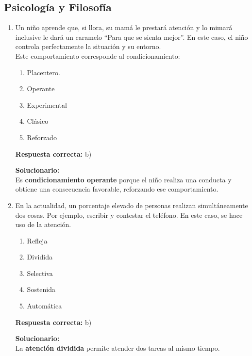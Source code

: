 \subsection*{Psicología y Filosofía}

\begin{enumerate}
	
	
	\item Un niño aprende que, si llora, su mamá le prestará atención y lo mimará inclusive le dará un caramelo “Para que se sienta mejor”. En este caso, el niño controla perfectamente la situación y su entorno.\\
	Este comportamiento corresponde al condicionamiento:
	\begin{enumerate}[label=\alph*)]
		\item Placentero.
		\item Operante
		\item Experimental
		\item Clásico
		\item Reforzado
	\end{enumerate}
	\textbf{Respuesta correcta:} b)
	
	\vspace{2mm}
	\textbf{Solucionario:}\\
	Es \textbf{condicionamiento operante} porque el niño realiza una conducta y obtiene una consecuencia favorable, reforzando ese comportamiento.
	
	\vspace{6mm}
	
	\item En la actualidad, un porcentaje elevado de personas realizan simultáneamente dos cosas. Por ejemplo, escribir y contestar el teléfono. En este caso, se hace uso de la atención.
	\begin{enumerate}[label=\alph*)]
		\item Refleja
		\item Dividida
		\item Selectiva
		\item Sostenida
		\item Automática
	\end{enumerate}
	\textbf{Respuesta correcta:} b)
	
	\vspace{2mm}
	\textbf{Solucionario:}\\
	La \textbf{atención dividida} permite atender dos tareas al mismo tiempo.
	
	\vspace{6mm}
	

\end{enumerate}

